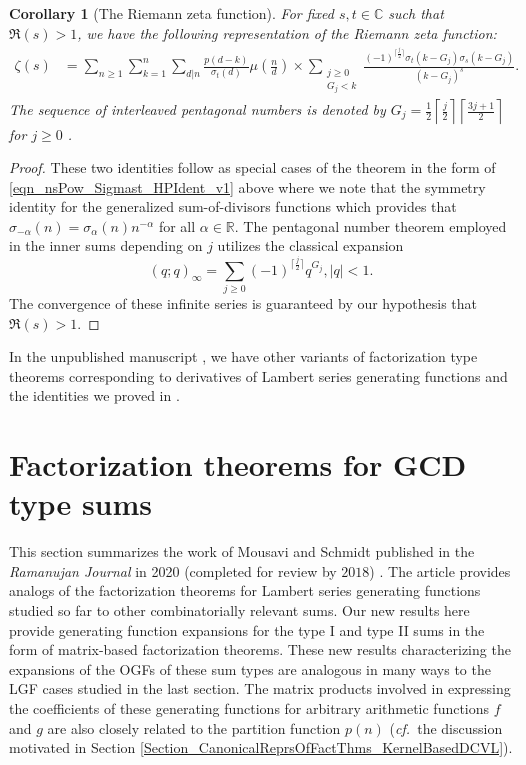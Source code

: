 \documentclass[12pt,reqno,a4letter]{article}
\numberwithin{figure}{section}
\numberwithin{table}{section}
\numberwithin{equation}{section}
\newcommand{\cf}{\textit{cf.~}}
\newcommand{\seqnum}[1]{\href{http://oeis.org/#1}{\color{ProcessBlue}{\underline{#1}}}}
\theoremstyle{plain}
\newtheorem{cor}[theorem]{Corollary}
\numberwithin{theorem}{section}
\theoremstyle{definition}
\begin{document}
\begin{cor}[The Riemann zeta function] 
\label{cor_SumOfDivFns_ZetaFnIdents}
For fixed $s,t \in \mathbb{C}$ such that $\Re(s) > 1$, 
we have the following representation of the Riemann zeta function: 
\begin{align*} 
\zeta(s) & = \sum_{n \geq 1} \sum_{k=1}^n \sum_{d|n} \frac{p(d-k)}{\sigma_t(d)} \mu\left(\frac{n}{d}\right) \times 
	\sum_{\substack{j \geq 0 \\ G_j < k}} \frac{(-1)^{\lceil \frac{j}{2} \rceil} 
	\sigma_t(k-G_j) \sigma_s(k-G_j)}{(k-G_j)^s}. 
\end{align*} 
The sequence of interleaved pentagonal numbers is denoted by 
$G_j = \frac{1}{2} \left\lceil \frac{j}{2} \right\rceil \left\lceil \frac{3j+1}{2} \right\rceil$ for 
$j \geq 0$ \cite[\seqnum{A001318}]{OEIS}. 
\end{cor} 
\begin{proof} 
These two identities follow as special cases of the theorem in the form of 
\eqref{eqn_nsPow_Sigmast_HPIdent_v1} above where we note that the symmetry 
identity for the generalized 
sum-of-divisors functions which provides that $\sigma_{-\alpha}(n) = \sigma_{\alpha}(n) n^{-\alpha}$ 
for all $\alpha \in \mathbb{R}$. 
The pentagonal number theorem employed in the inner sums depending on $j$ 
utilizes the classical expansion 
\[
(q; q)_{\infty} = \sum_{j \geq 0} (-1)^{\lceil \frac{j}{2} \rceil} q^{G_j}, |q| < 1. 
\] 
The convergence of these infinite series is guaranteed by our hypothesis that $\Re(s) > 1$. 
\end{proof} 

In the unpublished manuscript \cite{MDS-HADAMARD-FACTTHMS}, we have other variants of 
factorization type theorems corresponding to derivatives of Lambert series generating functions 
and the identities we proved in \cite{MDS-COMBRESTRDIVSUMS-INTEGERS}. 

\newpage
\section{Factorization theorems for GCD type sums} 
\label{Section_FactThmsTypeIAndIISums_MousaviSchmidt}

This section summarizes the work of Mousavi and Schmidt published in the 
\emph{Ramanujan Journal} in 2020 (completed for review by $2018$) 
\cite{MOUSAVI-SCHMIDT-2019}. 
The article provides analogs of the factorization theorems for Lambert series 
generating functions studied so far to other combinatorially relevant sums. 
Our new results here provide generating function expansions for the type I and type II 
sums in the form of matrix-based factorization theorems. 
These new results characterizing the expansions of the OGFs of these sum types are 
analogous in many ways to the LGF cases studied in the last section. 
The matrix products involved in expressing the coefficients of these generating 
functions for arbitrary arithmetic functions $f$ and $g$ are also closely related to the 
partition function $p(n)$ (\cf the discussion motivated in 
Section \ref{Section_CanonicalReprsOfFactThms_KernelBasedDCVL}). 
\end{document}
